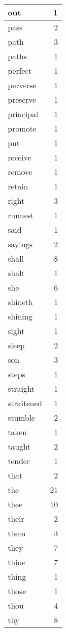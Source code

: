 \begin{center}
\begin{longtable}{l|r}
out & 1\\ \hline 
pass & 2\\ \hline 
path & 3\\ \hline 
paths & 1\\ \hline 
perfect & 1\\ \hline 
perverse & 1\\ \hline 
preserve & 1\\ \hline 
principal & 1\\ \hline 
promote & 1\\ \hline 
put & 1\\ \hline 
receive & 1\\ \hline 
remove & 1\\ \hline 
retain & 1\\ \hline 
right & 3\\ \hline 
runnest & 1\\ \hline 
said & 1\\ \hline 
sayings & 2\\ \hline 
shall & 8\\ \hline 
shalt & 1\\ \hline 
she & 6\\ \hline 
shineth & 1\\ \hline 
shining & 1\\ \hline 
sight & 1\\ \hline 
sleep & 2\\ \hline 
son & 3\\ \hline 
steps & 1\\ \hline 
straight & 1\\ \hline 
straitened & 1\\ \hline 
stumble & 2\\ \hline 
taken & 1\\ \hline 
taught & 2\\ \hline 
tender & 1\\ \hline 
that & 2\\ \hline 
the & 21\\ \hline 
thee & 10\\ \hline 
their & 2\\ \hline 
them & 3\\ \hline 
they & 7\\ \hline 
thine & 7\\ \hline 
thing & 1\\ \hline 
those & 1\\ \hline 
thou & 4\\ \hline 
thy & 8\\ \hline 

\end{longtable}
\end{center}
